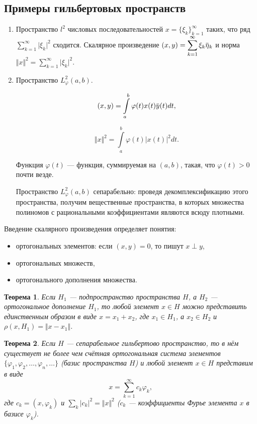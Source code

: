 \documentclass[12pt,a4paper,titlepage,oneside]{book}
\newcommand{\overbar}[1]{\mkern 1.5mu\overline{\mkern-1.5mu#1\mkern-1.5mu}\mkern 1.5mu}
\theoremstyle{definition}
\theoremstyle{plain}
\newtheorem*{theorem}{Теорема}
\theoremstyle{break}
\theoremstyle{remark}
\theoremstyle{remark}
\theoremstyle{remark}
\theoremstyle{remark}
\theoremstyle{plain}
\theoremstyle{plain}
\begin{document}
\subsection*{Примеры гильбертовых пространств}

\begin{enumerate}
	\item Пространство $l^2$ числовых последовательностей $x = \lbrace \xi_k \rbrace_{k=1}^{\infty}$ таких, что ряд $\displaystyle\sum_{k=1}^{\infty} \lvert \xi_k \rvert^2$ сходится. Скалярное произведение $(x, y) = \displaystyle\sum_{k=1}^{\infty} \xi_k \overbar{\eta}_k$ и норма $\Vert x \Vert^2 = \displaystyle\sum_{k=1}^{\infty} \lvert \xi_k \rvert^2$.
	
	\item Пространство $L_{\varphi}^2 (a, b)$.
	
	$$ (x, y) = \displaystyle\int\limits_a^b \varphi(t) x(t) \overbar{y}(t) dt,$$
	
	$$ \Vert x \Vert^2 = \displaystyle\int\limits_a^b \varphi(t) \lvert x(t) \rvert^2 dt.$$
	
	Функция $\varphi(t)$ --- функция, суммируемая на $(a, b)$, такая, что $\varphi(t) > 0$ почти везде.
	
	Пространство $L_{\varphi}^2 (a, b)$ сепарабельно: проведя декомплексификацию этого пространства, получим вещественные пространства, в которых множества полиномов с рациональными коэффициентами являются всюду плотными.
\end{enumerate}

Введение скалярного произведения определяет понятия:

\begin{itemize}
	\item ортогональных элементов: если $(x, y) = 0$, то пишут $x \perp y$,
	
	\item ортогональных множеств,
	
	\item ортогонального дополнения множества.
\end{itemize}

\begin{theorem}
	Если $H_1$ --- подпространство пространства $H$, а $H_2$ --- ортогональное дополнение $H_1$, то любой элемент $x \in H$ можно представить единственным образом в виде $x = x_1 + x_2$, где $x_1 \in H_1$, а $x_2 \in H_2$ и $\rho(x, H_1) = \Vert x - x_1 \Vert$.
\end{theorem}

\begin{theorem}
Если $H$ --- сепарабельное гильбертово пространство, то в нём существует не более чем счётная ортогональная система элементов $\lbrace \varphi_1, \varphi_2, \ldots, \varphi_n, \ldots \rbrace$ (базис пространства $H$) и любой элемент $x \in H$ представим в виде 
$$x = \displaystyle\sum_{k=1}^{\infty} c_k \varphi_k,$$
где $c_k = (x, \varphi_k)$ и $\displaystyle\sum_{k} \lvert c_k \rvert^2 = \Vert x \Vert^2$ ($c_k$ --- коэффициенты Фурье элемента $x$ в базисе $\varphi_k$).
\end{theorem}
\end{document}
